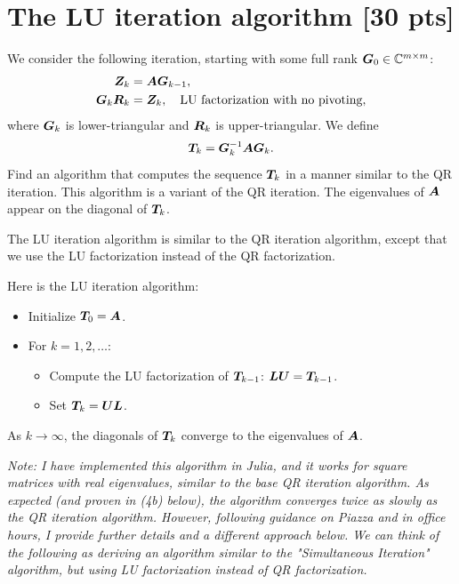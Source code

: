 \documentclass[twoside,10pt]{article}
\begin{document}
\section{The LU iteration algorithm [30 pts]} 
We consider the following iteration, starting with some full rank $\bm{G}_0 \in \mathbb{C}^{m \times m}$:
\begin{align}
  \bm{Z}_k &= \bm{A} \bm{G}_{k - 1}, \\
  \bm{G}_{k} \bm{R}_{k} &= \bm{Z}_k, \quad \text{LU factorization with no pivoting}, 
\end{align}
where $\bm{G}_k$ is lower-triangular and $\bm{R}_{k}$ is upper-triangular.
We define 
\begin{equation}
  \bm{T}_k = \bm{G}_{k}^{-1} \bm{A} \bm{G}_k.
\end{equation}
Find an algorithm that computes the sequence $\bm{T}_{k}$ in a manner similar to the QR iteration. 
This algorithm is a variant of the QR iteration. The eigenvalues of $\bm{A}$ appear on the diagonal of $\bm{T}_k$.

\hbox{}

\quad The LU iteration algorithm is similar to the QR iteration algorithm, except that we use the LU factorization instead of the QR factorization.

Here is the LU iteration algorithm:
\begin{itemize}
  \item Initialize $\bm{T}_0 = \bm{A}$.
  \item For $k = 1, 2, \ldots$:
  \begin{itemize}
    \item Compute the LU factorization of $\bm{T}_{k-1}$: $\bm{L} \bm{U} = \bm{T}_{k-1}$.
    \item Set $\bm{T}_{k} = \bm{U} \bm{L}$.
  \end{itemize}
\end{itemize}
As $k \rightarrow \infty$, the diagonals of $\bm{T}_k$ converge to the eigenvalues of $\bm{A}$.

\textit{Note: I have implemented this algorithm in Julia, and it works for square matrices with real eigenvalues, similar to the base QR iteration algorithm.
As expected (and proven in (4b) below), the algorithm converges twice as slowly as the QR iteration algorithm.
However, following guidance on Piazza and in office hours, I provide further details and a different approach below.
We can think of the following as deriving an algorithm similar to the "Simultaneous Iteration" algorithm, but using LU factorization instead of QR factorization.}
\end{document}
